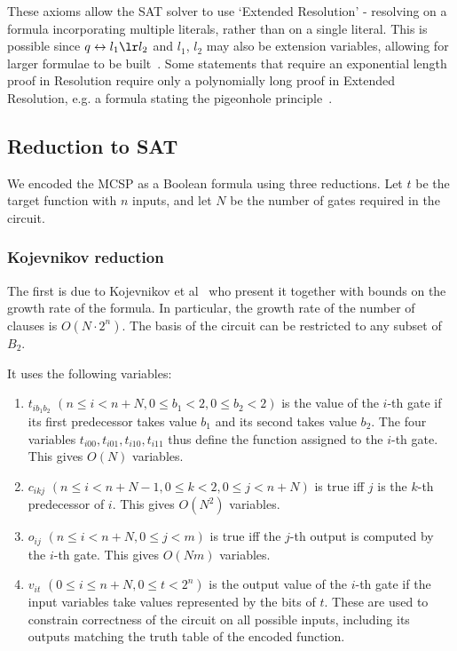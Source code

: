 \documentclass{article}
\begin{document}
These axioms allow the SAT solver to use `Extended Resolution' - resolving on a formula incorporating multiple literals, rather than on a single literal. This is possible since $q \leftrightarrow l_1 \lr l_2$ and $l_1$, $l_2$ may also be extension variables, allowing for larger formulae to be built~\cite{krajicek}. Some statements that require an exponential length proof in Resolution require only a polynomially long proof in Extended Resolution, e.g. a formula stating the pigeonhole principle~\cite{cook79}.

\subsection{Reduction to SAT}

We encoded the MCSP as a Boolean formula using three reductions. Let $t$ be the target function with $n$ inputs, and let $N$ be the number of gates required in the circuit.

\subsubsection{Kojevnikov reduction}

The first is due to Kojevnikov et al~\cite{kulikov} who present it together with bounds on the growth rate of the formula. In particular, the growth rate of the number of clauses is $O(N \cdot 2^n)$. The basis of the circuit can be restricted to any subset of \(B_2\).

It uses the following variables:

\begin{enumerate}

  \item $t_{ib_1b_2}$ $(n \leq i < n + N, 0 \leq b_1 < 2, 0 \leq b_2 < 2)$ is the value of the $i$-th gate if its first predecessor takes value $b_1$ and its second takes value $b_2$. The four variables $t_{i00}, t_{i01}, t_{i10}, t_{i11}$ thus define the function assigned to the $i$-th gate. This gives $O(N)$ variables.
  \item $c_{ikj}$ $(n \leq i < n + N - 1, 0 \leq k < 2, 0 \leq j < n + N)$ is true iff $j$ is the $k$-th predecessor of $i$. This gives $O(N^2)$ variables.
  \item $o_{ij}$ $(n \leq i < n + N, 0 \leq j < m)$ is true iff the $j$-th output is computed by the $i$-th gate. This gives $O(Nm)$ variables.
  \item $v_{it}$ $(0 \leq i \leq n + N, 0 \leq t < 2^n)$ is the output value of the $i$-th gate if the input variables take values represented by the bits of $t$. These are used to constrain correctness of the circuit on all possible inputs, including its outputs matching the truth table of the encoded function.

\end{enumerate}
\end{document}
